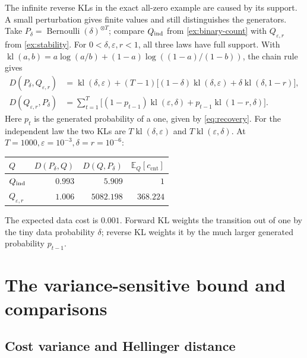 \documentclass[11pt,twoside]{article}
\newcommand{\E}{\mathbb E}
\newcommand{\KL}{D}
\theoremstyle{definition}
\theoremstyle{remark}
\begin{document}
The infinite reverse KLs in the exact all-zero example are caused by
its support. A small perturbation gives finite values and still
distinguishes the generators.
Take \(P_\delta=\operatorname{Bernoulli}(\delta)^{\otimes T}\);
compare \(Q_{\rm ind}\) from \cref{ex:binary-count} with
\(Q_{\varepsilon,r}\) from \cref{ex:stability}. For \(0<\delta,\varepsilon,r<1\), all three
laws have full support. With
\(\operatorname{kl}(a,b)=a\log(a/b)+(1-a)\log((1-a)/(1-b))\),
the chain rule gives
\begin{align*}
 \KL(P_\delta, Q_{\varepsilon,r})
 &=\operatorname{kl}(\delta,\varepsilon)
 +(T-1)\bigl[(1-\delta)\operatorname{kl}(\delta,\varepsilon)
       +\delta\operatorname{kl}(\delta,1-r)\bigr],\\
 \KL(Q_{\varepsilon,r}, P_\delta)
 &=\sum_{t=1}^T
 \bigl[(1-p_{t-1})\operatorname{kl}(\varepsilon,\delta)
       +p_{t-1}\operatorname{kl}(1-r,\delta)\bigr].
\end{align*}
Here \(p_t\) is the generated probability of a one, given by
\cref{eq:recovery}. For the independent law the two KLs are
\(T\operatorname{kl}(\delta,\varepsilon)\) and
\(T\operatorname{kl}(\varepsilon,\delta)\).
At \(T=1000,\varepsilon=10^{-3},\delta=r=10^{-6}\):
\begin{center}
\begin{tabular}{lrrr}
\toprule
\(Q\) & \(\KL(P_\delta, Q)\)
 & \(\KL(Q, P_\delta)\) & \(\E_Q[c_{\mathrm{cnt}}]\)\\
\midrule
\(Q_{\rm ind}\) & \(0.993\) & \(5.909\) & \(1\)\\
\(Q_{\varepsilon,r}\) & \(1.006\) & \(5082.198\) & \(368.224\)\\
\bottomrule
\end{tabular}
\end{center}
The expected data cost is \(0.001\).
Forward KL weights the transition out of one by the tiny data
probability \(\delta\); reverse KL weights it by the much larger
generated probability \(p_{t-1}\).

\section{The variance-sensitive bound and comparisons}
\label{app:forward-cost}

\subsection{Cost variance and Hellinger distance}
\label{app:hellinger}
\end{document}
